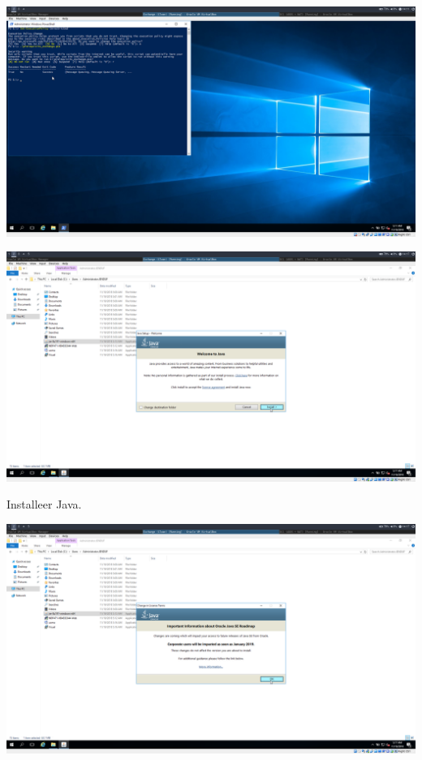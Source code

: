 \documentclass[a4paper]{article}
\begin{document}
	\begin{center}
	\includegraphics[width=15cm]{Pictures/Exchange/Pre/1542633119.png}
\end{center}
	\begin{center}
	\includegraphics[width=15cm]{Pictures/Exchange/Pre/1542633454.png}
	
	Installeer Java.
\end{center}
	\begin{center}
	\includegraphics[width=15cm]{Pictures/Exchange/Pre/1542633458.png}
\end{center}
\end{document}
